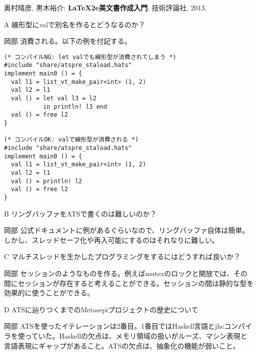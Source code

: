 \documentclass{ipsjprosym}
\begin{document}
\begin{thebibliography}{9}
  奥村晴彦, 黒木裕介: \textbf{LaTeX2e美文書作成入門}. 技術評論社, 2013.
\end{thebibliography}

\begin{QandA}
\item[A] 線形型にvalで別名を作るとどうなるのか？
\item[岡部] 消費される。以下の例を付記する。

\begin{verbatim}
(* コンパイルNG: let valでも線形型が消費されてしまう *)
#include "share/atspre_staload.hats"
implement main0 () = {
  val l1 = list_vt_make_pair<int> (1, 2)
  val l2 = l1
  val () = let val l3 = l2
           in println! l3 end
  val () = free l2
}

(* コンパイルOK: valで線形型が消費される *)
#include "share/atspre_staload.hats"
implement main0 () = {
  val l1 = list_vt_make_pair<int> (1, 2)
  val l2 = l1
  val () = println! l2
  val () = free l2
}
\end{verbatim}

\item[B] リングバッファをATSで書くのは難しいのか？
\item[岡部] 公式ドキュメントに例があるぐらいなので、リングバッファ自体は簡単。しかし、スレッドセーフ化や再入可能にするのはそれなりに難しい。
\item[C] マルチスレッドを生かしたプログラミングをするにはどうすれば良いか？
\item[岡部] セッションのようなものを作る。例えばmutexのロックと開放では、その間にセッションが存在すると考えることができる。セッションの間は静的な型を効果的に使うことができる。
\item[D] ATSに辿りつくまでのMetasepiプロジェクトの歴史について
\item[岡部] ATSを使ったイテレーションは2番目。1番目ではHaskell言語とjhcコンパイラを使っていた。Haskellの欠点は、メモリ領域の扱いがルーズ、マシン表現と言語表現にギャップがあること。ATSの欠点は、抽象化の機能が弱いこと。
\end{QandA}
\end{document}
